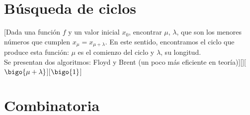 \section{Búsqueda de ciclos}
		[Dada una función $f$ y un valor inicial $x_{0}$, encontrar $\mu$, $\lambda$, que son los menores números que cumplen $x_{\mu} = x_{\mu + \lambda}$. En este sentido, encontramos el ciclo que produce esta función: $\mu$ es el comienzo del ciclo y $\lambda$, su longitud. \\ Se presentan dos algoritmos: Floyd y Brent (un poco más eficiente en teoría)][][$\bigo{\mu + \lambda}$][$\bigo{1}$]

\section{Combinatoria}


